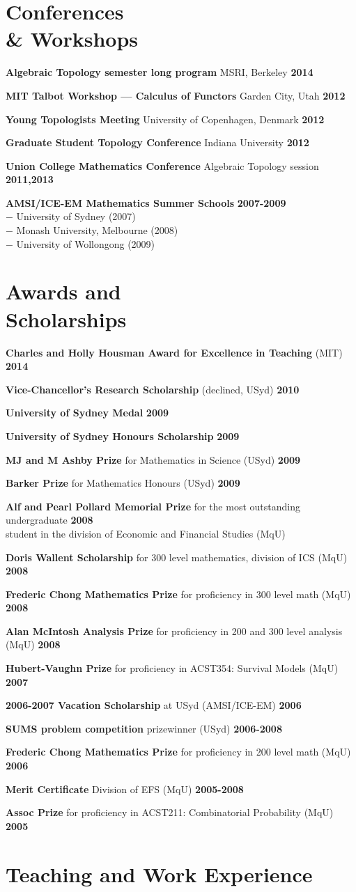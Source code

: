 \documentclass[margin,line]{resume}
\newcommand{\CVsection}[1]{\section{\mysidestyle #1}}
\newcommand{\entry}[3]{\textbf{#1} #2 \hfill \textbf{#3}
           
\vspace{-2.6mm}}
\newcommand{\twolineentry}[4]{\textbf{#1} #2 \hfill \textbf{#4}\\%
#3
           
\vspace{-2.6mm}}
\newcommand{\FINALentry}[3]{\textbf{#1} #2 \hfill \textbf{#3}}
\newcommand{\FINALtwolineentry}[4]{\textbf{#1} #2 \hfill \textbf{#4}\\%
#3}
\begin{document}
\begin{resume}
\CVsection{Conferences \\ \& Workshops}

\entry{Algebraic Topology semester long program}{MSRI, Berkeley}{2014}
\entry{MIT Talbot Workshop --- Calculus of Functors}{Garden City, Utah}{2012}
\entry{Young Topologists Meeting}{University of Copenhagen, Denmark}{2012}
\entry{Graduate Student Topology Conference}{Indiana University}{2012}
\entry{Union College Mathematics Conference}{Algebraic Topology session}{2011,2013}
\FINALtwolineentry{AMSI/ICE-EM Mathematics Summer Schools}{}{%
\phantom{space}$-$ University of Sydney (2007)\\
\phantom{space}$-$ Monash University, Melbourne (2008)\\
\phantom{space}$-$ University of Wollongong (2009)%
}{2007-2009}


\CVsection{Awards and\\Scholarships} 

\entry{Charles and Holly Housman Award for Excellence in Teaching}{(MIT)}{2014}
\entry{Vice-Chancellor's Research Scholarship}{(declined, USyd)}{2010}
\entry{University of Sydney Medal}{}{2009}
\entry{University of Sydney Honours Scholarship}{}{2009}
\entry{MJ and M Ashby Prize}{for Mathematics in Science (USyd)}{2009}
\entry{Barker Prize}{for Mathematics Honours (USyd)}{2009}
\twolineentry{Alf and Pearl Pollard Memorial Prize}{for the most outstanding undergraduate}{student in the division of Economic and Financial Studies (MqU)}{2008}
\entry{Doris Wallent Scholarship}{for 300 level mathematics, division of ICS (MqU)}{2008}
\entry{Frederic Chong Mathematics Prize}{for proficiency in 300 level math (MqU)}{2008}
\entry{Alan McIntosh Analysis Prize}{for proficiency in 200 and 300 level analysis (MqU)}{2008}
\entry{Hubert-Vaughn Prize}{for proficiency in ACST354: Survival Models (MqU)}{2007}
\entry{2006-2007 Vacation Scholarship}{at USyd (AMSI/ICE-EM)}{2006}
\entry{SUMS problem competition}{prizewinner (USyd)}{2006-2008}
\entry{Frederic Chong Mathematics Prize}{for proficiency in 200 level math (MqU)}{2006}
\entry{Merit Certificate}{Division of EFS (MqU)}{2005-2008}
\FINALentry{Assoc Prize}{for proficiency in ACST211: Combinatorial Probability (MqU)}{2005}


\CVsection{Teaching and Work Experience}


\end{resume}
\end{document}
